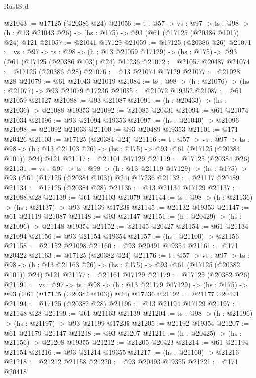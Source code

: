 \begin{lexlean}{RustStd}
\begin{coremodule}
@21043 := @17125 (@20386 @24)
@21056 := {t : @57} ->
  {vs : @97} ->
  {ts : @98} -> (h : @13 @21043 @26) -> (hs : @175) -> @93 (@61 (@17125 (@20386 @101)) @24) @121
@21057 := @21041 @17129
@21059 := @17125 (@20386 @26)
@21071 := {vs : @97} ->
  {ts : @98} ->
  (h : @13 @21059 @17129) -> (hs : @175) -> @93 (@61 (@17125 (@20386 @103)) @24) @17236
@21072 := @21057 @20487
@21074 := @17125 (@20386 @28)
@21076 := @13 @21074 @17129
@21077 := @21028 @28
@21079 := @61 @21043 @21019
@21084 := {ts : @98} -> (h : @21076) -> (hs : @21077) -> @93 @21079 @17236
@21085 := @21072 @19352
@21087 := @61 @21059 @21027
@21088 := @93 @21087
@21091 := (h : @20433) -> (hs : @21036) -> @21088 @19353
@21092 := @21085 @20431
@21094 := @61 @21074 @21034
@21096 := @93 @21094 @19353
@21097 := (hs : @21040) -> @21096
@21098 := @21092 @21038
@21100 := @93 @20489 @19353
@21101 := @171 @20426
@21103 := @17125 (@20384 @24)
@21116 := {t : @57} ->
  {vs : @97} ->
  {ts : @98} -> (h : @13 @21103 @26) -> (hs : @175) -> @93 (@61 (@17125 (@20384 @101)) @24) @121
@21117 := @21101 @17129
@21119 := @17125 (@20384 @26)
@21131 := {vs : @97} ->
  {ts : @98} ->
  (h : @13 @21119 @17129) -> (hs : @175) -> @93 (@61 (@17125 (@20384 @103)) @24) @17236
@21132 := @21117 @20489
@21134 := @17125 (@20384 @28)
@21136 := @13 @21134 @17129
@21137 := @21088 @28
@21139 := @61 @21103 @21079
@21144 := {ts : @98} -> (h : @21136) -> (hs : @21137) -> @93 @21139 @17236
@21145 := @21132 @19353
@21147 := @61 @21119 @21087
@21148 := @93 @21147
@21151 := (h : @20429) -> (hs : @21096) -> @21148 @19354
@21152 := @21145 @20427
@21154 := @61 @21134 @21094
@21156 := @93 @21154 @19354
@21157 := (hs : @21100) -> @21156
@21158 := @21152 @21098
@21160 := @93 @20491 @19354
@21161 := @171 @20422
@21163 := @17125 (@20382 @24)
@21176 := {t : @57} ->
  {vs : @97} ->
  {ts : @98} -> (h : @13 @21163 @26) -> (hs : @175) -> @93 (@61 (@17125 (@20382 @101)) @24) @121
@21177 := @21161 @17129
@21179 := @17125 (@20382 @26)
@21191 := {vs : @97} ->
  {ts : @98} ->
  (h : @13 @21179 @17129) -> (hs : @175) -> @93 (@61 (@17125 (@20382 @103)) @24) @17236
@21192 := @21177 @20491
@21194 := @17125 (@20382 @28)
@21196 := @13 @21194 @17129
@21197 := @21148 @28
@21199 := @61 @21163 @21139
@21204 := {ts : @98} -> (h : @21196) -> (hs : @21197) -> @93 @21199 @17236
@21205 := @21192 @19354
@21207 := @61 @21179 @21147
@21208 := @93 @21207
@21211 := (h : @20425) -> (hs : @21156) -> @21208 @19355
@21212 := @21205 @20423
@21214 := @61 @21194 @21154
@21216 := @93 @21214 @19355
@21217 := (hs : @21160) -> @21216
@21218 := @21212 @21158
@21220 := @93 @20493 @19355
@21221 := @171 @20418

\end{coremodule}
\end{lexlean}
